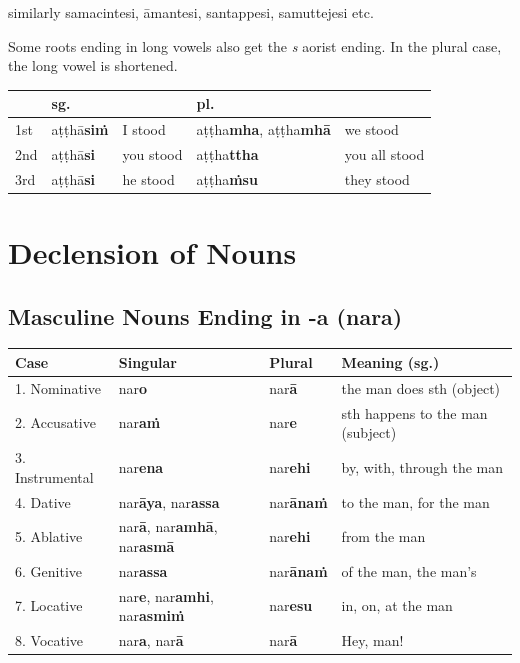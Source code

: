 \documentclass[11pt,oneside]{memoir}
\begin{document}
similarly samacintesi, āmantesi, santappesi, samuttejesi etc.

Some roots ending in long vowels also get the \emph{s} aorist ending. In the plural case, the long vowel is shortened.

\begin{center}
\begin{tabular}{lllll}
 & \textbf{sg.} &  & \textbf{pl.} & \\
\hline
1st & aṭṭhā\textbf{siṁ} & I stood & aṭṭha\textbf{mha}, aṭṭha\textbf{mhā} & we stood\\
2nd & aṭṭhā\textbf{si} & you stood & aṭṭha\textbf{ttha} & you all stood\\
3rd & aṭṭhā\textbf{si} & he stood & aṭṭha\textbf{ṁsu} & they stood\\
\end{tabular}
\end{center}
\section{Declension of Nouns}
\label{sec:orgf55c6c7}

\clearpage
\subsection{Masculine Nouns Ending in -a (nara)}
\label{sec:orge0135cb}

\begin{center}
\begin{tabular}{llll}
Case & Singular & Plural & Meaning (sg.)\\
\hline
1. Nominative & nar\textbf{o} & nar\textbf{ā} & the man does sth (object)\\
2. Accusative & nar\textbf{aṁ} & nar\textbf{e} & sth happens to the man (subject)\\
3. Instrumental & nar\textbf{ena} & nar\textbf{ehi} & by, with, through the man\\
4. Dative & nar\textbf{āya}, nar\textbf{assa} & nar\textbf{ānaṁ} & to the man, for the man\\
5. Ablative & nar\textbf{ā}, nar\textbf{amhā}, nar\textbf{asmā} & nar\textbf{ehi} & from the man\\
6. Genitive & nar\textbf{assa} & nar\textbf{ānaṁ} & of the man, the man's\\
7. Locative & nar\textbf{e}, nar\textbf{amhi}, nar\textbf{asmiṁ} & nar\textbf{esu} & in, on, at the man\\
8. Vocative & nar\textbf{a}, nar\textbf{ā} & nar\textbf{ā} & Hey, man!\\
\end{tabular}
\end{center}
\end{document}
